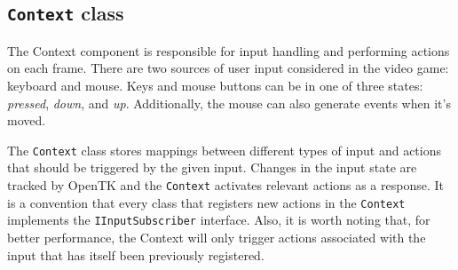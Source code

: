 \subsection{\texttt{Context} class}
The Context component is responsible for input handling and performing actions on each frame.
There are two sources of user input considered in the video game: keyboard and mouse.
Keys and mouse buttons can be in one of three states: \textit{pressed}, \textit{down}, and \textit{up}.
Additionally, the mouse can also generate events when it's moved.

The \texttt{Context} class stores mappings between different types of input and actions that should be triggered by the given input.
Changes in the input state are tracked by OpenTK and the \texttt{Context} activates relevant actions as a response.
It is a convention that every class that registers new actions in the \texttt{Context} implements the \texttt{IInputSubscriber} interface.
Also, it is worth noting that, for better performance, the Context will only trigger actions associated with the input that has itself been previously registered.